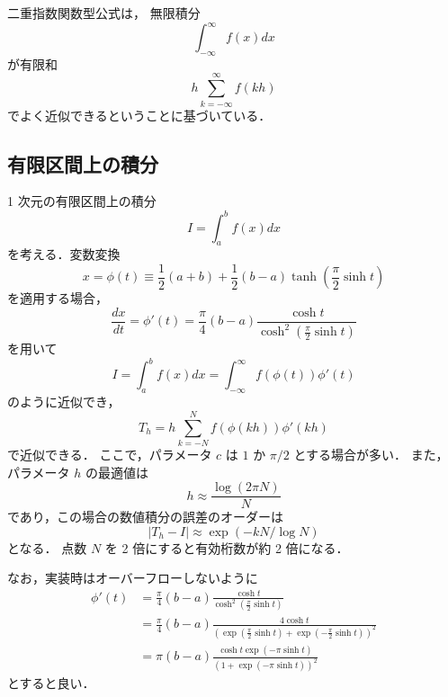 二重指数関数型公式は，
無限積分
\begin{equation}
    \int_{-\infty}^{\infty} f(x) dx
\end{equation}
が有限和
\begin{equation}
    h \sum_{k = -\infty}^{\infty} f(kh)
\end{equation}
でよく近似できるということに基づいている\cite[6.1 節 (b)]{Mori1993}．

\subsection{有限区間上の積分}

1 次元の有限区間上の積分
\begin{equation}
    I = \int_{a}^{b} f(x) dx
\end{equation}
を考える．変数変換
\begin{equation}
    x = \phi(t) \equiv \frac{1}{2}(a + b) + \frac{1}{2}(b - a) \tanh \left(\frac{\pi}{2} \sinh{t}\right)
\end{equation}
を適用する場合，
\begin{equation}
    \frac{dx}{dt} = \phi'(t)
    = \frac{\pi}{4} (b - a) \frac{\cosh{t}}{\cosh^2 \left(\frac{\pi}{2} \sinh{t}\right)}
\end{equation}
を用いて
\begin{equation}
    I = \int_{a}^{b} f(x) dx
    = \int_{-\infty}^{\infty} f(\phi(t)) \phi'(t)
\end{equation}
のように近似でき，
\begin{equation}
    T_h = h \sum_{k = -N}^{N} f(\phi(kh)) \phi'(kh)
\end{equation}
で近似できる．
ここで，パラメータ $c$ は $1$ か $\pi/2$ とする場合が多い\cite[Section 4.5]{Press2007}．
また，パラメータ $h$ の最適値は
\begin{equation}
    h \approx \frac{\log(2 \pi N)}{N}
\end{equation}
であり，この場合の数値積分の誤差のオーダーは
\begin{equation}
    |T_h - I| \approx \exp(-kN / \log{N})
\end{equation}
となる\cite[Section 4.5]{Press2007}．
点数 $N$ を 2 倍にすると有効桁数が約 2 倍になる．

なお，実装時はオーバーフローしないように
\begin{align}
    \phi'(t)
     & = \frac{\pi}{4} (b - a) \frac{\cosh{t}}{\cosh^2 \left(\frac{\pi}{2} \sinh{t}\right)}                                              \\
     & = \frac{\pi}{4} (b - a) \frac{4 \cosh{t}}{(\exp\left(\frac{\pi}{2} \sinh{t}\right) + \exp\left(-\frac{\pi}{2} \sinh{t}\right))^2} \\
     & = \pi (b - a) \frac{\cosh{t} \exp(-\pi \sinh{t})}{(1 + \exp(-\pi \sinh{t}))^2}
\end{align}
とすると良い\cite[Section 4.5.2]{Press2007}．

